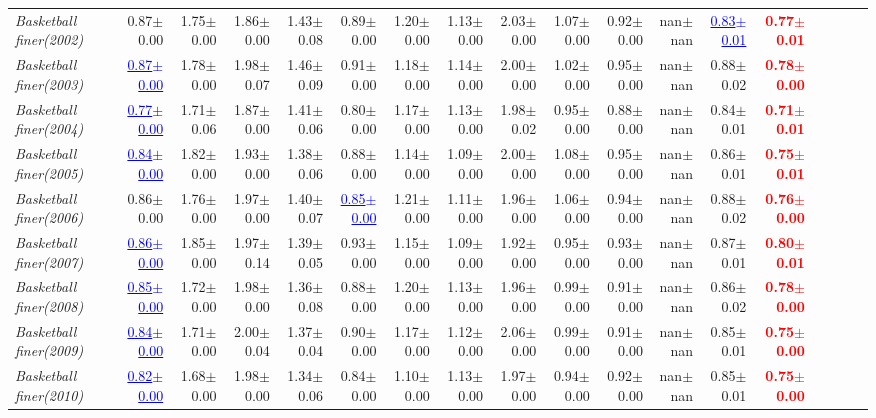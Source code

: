 \documentclass[nohyperref]{article}
\theoremstyle{plain}
\theoremstyle{definition}
\theoremstyle{remark}
\newcommand{\red}[1]{\textcolor{red}{\textbf{#1}}}
\newcommand{\blue}[1]{\textcolor{blue}{\underline{#1}}}
\begin{document}
\begin{table*}[!ht]
{\begin{tabular}{lrrrrrrrrrrrrrrrrr}
			{\it Basketball finer(2002)} & 0.87$\pm$0.00 & 1.75$\pm$0.00 & 1.86$\pm$0.00 & 1.43$\pm$0.08 & 0.89$\pm$0.00 & 1.20$\pm$0.00 & 1.13$\pm$0.00 & 2.03$\pm$0.00 & 1.07$\pm$0.00 & 0.92$\pm$0.00 & nan$\pm$nan & \blue{0.83$\pm$0.01} & \red{0.77$\pm$0.01} \\
			{\it Basketball finer(2003)} & \blue{0.87$\pm$0.00} & 1.78$\pm$0.00 & 1.98$\pm$0.07 & 1.46$\pm$0.09 & 0.91$\pm$0.00 & 1.18$\pm$0.00 & 1.14$\pm$0.00 & 2.00$\pm$0.00 & 1.02$\pm$0.00 & 0.95$\pm$0.00 & nan$\pm$nan & 0.88$\pm$0.02 & \red{0.78$\pm$0.00} \\
			{\it Basketball finer(2004)} & \blue{0.77$\pm$0.00} & 1.71$\pm$0.06 & 1.87$\pm$0.00 & 1.41$\pm$0.06 & 0.80$\pm$0.00 & 1.17$\pm$0.00 & 1.13$\pm$0.00 & 1.98$\pm$0.02 & 0.95$\pm$0.00 & 0.88$\pm$0.00 & nan$\pm$nan & 0.84$\pm$0.01 & \red{0.71$\pm$0.01} \\
			{\it Basketball finer(2005)} & \blue{0.84$\pm$0.00} & 1.82$\pm$0.00 & 1.93$\pm$0.00 & 1.38$\pm$0.06 & 0.88$\pm$0.00 & 1.14$\pm$0.00 & 1.09$\pm$0.00 & 2.00$\pm$0.00 & 1.08$\pm$0.00 & 0.95$\pm$0.00 & nan$\pm$nan & 0.86$\pm$0.01 & \red{0.75$\pm$0.01} \\
			{\it Basketball finer(2006)} & 0.86$\pm$0.00 & 1.76$\pm$0.00 & 1.97$\pm$0.00 & 1.40$\pm$0.07 & \blue{0.85$\pm$0.00} & 1.21$\pm$0.00 & 1.11$\pm$0.00 & 1.96$\pm$0.00 & 1.06$\pm$0.00 & 0.94$\pm$0.00 & nan$\pm$nan & 0.88$\pm$0.02 & \red{0.76$\pm$0.00} \\
			{\it Basketball finer(2007)} & \blue{0.86$\pm$0.00} & 1.85$\pm$0.00 & 1.97$\pm$0.14 & 1.39$\pm$0.05 & 0.93$\pm$0.00 & 1.15$\pm$0.00 & 1.09$\pm$0.00 & 1.92$\pm$0.00 & 0.95$\pm$0.00 & 0.93$\pm$0.00 & nan$\pm$nan & 0.87$\pm$0.01 & \red{0.80$\pm$0.01} \\
			{\it Basketball finer(2008)} & \blue{0.85$\pm$0.00} & 1.72$\pm$0.00 & 1.98$\pm$0.00 & 1.36$\pm$0.08 & 0.88$\pm$0.00 & 1.20$\pm$0.00 & 1.13$\pm$0.00 & 1.96$\pm$0.00 & 0.99$\pm$0.00 & 0.91$\pm$0.00 & nan$\pm$nan & 0.86$\pm$0.02 & \red{0.78$\pm$0.00} \\
			{\it Basketball finer(2009)} & \blue{0.84$\pm$0.00} & 1.71$\pm$0.00 & 2.00$\pm$0.04 & 1.37$\pm$0.04 & 0.90$\pm$0.00 & 1.17$\pm$0.00 & 1.12$\pm$0.00 & 2.06$\pm$0.00 & 0.99$\pm$0.00 & 0.91$\pm$0.00 & nan$\pm$nan & 0.85$\pm$0.01 & \red{0.75$\pm$0.00} \\
			{\it Basketball finer(2010)} & \blue{0.82$\pm$0.00} & 1.68$\pm$0.00 & 1.98$\pm$0.00 & 1.34$\pm$0.06 & 0.84$\pm$0.00 & 1.10$\pm$0.00 & 1.13$\pm$0.00 & 1.97$\pm$0.00 & 0.94$\pm$0.00 & 0.92$\pm$0.00 & nan$\pm$nan & 0.85$\pm$0.01 & \red{0.75$\pm$0.00} \\

\end{tabular}}
\end{table*}
\end{document}
